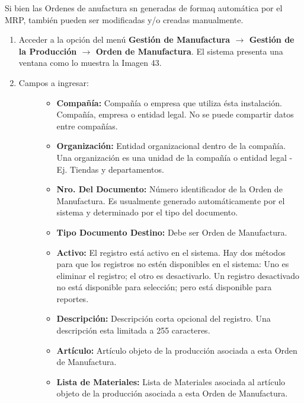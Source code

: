 \documentclass[letterpaper,10pt,spanish]{sphinxmanual}
\begin{document}
Si bien las Ordenes de anufactura sn generadas de formaq automática por el MRP, también pueden ser modificadas y/o creadas manualmente.
\begin{enumerate}
\item {} 
Acceder a la opción del menú \textbf{Gestión de Manufactura \(\rightarrow\)  Gestión de la Producción \(\rightarrow\) Orden de Manufactura}. El sistema presenta una ventana como lo muestra la Imagen 43.

\item {} \begin{description}
\item[{Campos a ingresar:}] \leavevmode\begin{itemize}
\item {} 
\textbf{Compañía:} Compañía o empresa que utiliza ésta instalación. Compañía, empresa o entidad legal. No se puede compartir datos entre compañías.

\item {} 
\textbf{Organización:} Entidad organizacional dentro de la compañía. Una organización es una unidad de la compañía o entidad legal - Ej. Tiendas y departamentos.

\item {} 
\textbf{Nro. Del Documento:} Número identificador de la Orden de Manufactura. Es usualmente generado automáticamente por el sistema y determinado por el tipo del documento.

\item {} 
\textbf{Tipo Documento Destino:} Debe ser Orden de Manufactura.

\item {} 
\textbf{Activo:} El registro está activo en el sistema. Hay dos métodos para que los registros no estén disponibles en el sistema: Uno es eliminar el registro; el otro es desactivarlo. Un registro desactivado no está disponible para selección; pero está disponible para reportes.

\item {} 
\textbf{Descripción:} Descripción corta opcional del registro. Una descripción esta limitada a 255 caracteres.

\item {} 
\textbf{Artículo:} Artículo objeto de la producción asociada a esta Orden de Manufactura.

\item {} 
\textbf{Lista de Materiales:} Lista de Materiales asociada al artículo objeto de la producción asociada a esta Orden de Manufactura.


\end{itemize}
\end{description}
\end{enumerate}
\end{document}
